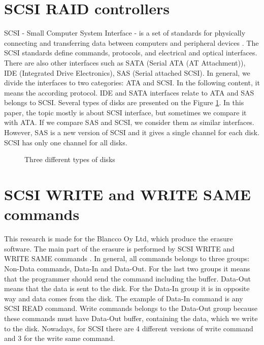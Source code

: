 \section{SCSI RAID controllers}
SCSI - Small Computer System Interface - is a set of standards for physically connecting and transferring data between computers and peripheral devices \cite{book_of_scsi}. The SCSI standards define commands, protocols, and electrical and optical interfaces. There are also other interfaces such as SATA (Serial ATA (AT Attachment)), IDE (Integrated Drive Electronics), SAS (Serial attached SCSI). In general, we divide the interfaces to two categories: ATA and SCSI. In the following content, it means the according protocol. IDE and SATA interfaces relate to ATA and SAS belongs to SCSI. Several types of disks are presented on the Figure \ref{fig:disks}. In this paper, the topic mostly is about SCSI interface, but sometimes we compare it with ATA. If we compare SAS and SCSI, we consider them as similar interfaces. However, SAS is a new version of SCSI and it gives a single channel for each disk. SCSI has only one channel for all disks.
\begin{figure}[h]
  \advance{}\textwidth
  \caption{Three different types of disks}
  \label{fig:disks}
\end{figure}

\section{SCSI WRITE and WRITE SAME commands}
\label{subsec:write_comm}
This research is made for the Blancco Oy Ltd, which produce the erasure software. The main part of the erasure is performed by SCSI WRITE and WRITE SAME commands \cite{scsi3_bc}. In general, all commands belongs to three groups: Non-Data commands, Data-In and Data-Out. For the last two groups it means that the programmer should send the command including the buffer. Data-Out means that the data is sent to the disk. For the Data-In group it is in opposite way and data comes from the disk. The example of Data-In command is any SCSI READ command. Write commands belongs to the Data-Out group because these commands must have Data-Out buffer, containing the data, which we write to the disk. Nowadays, for SCSI there are 4 different versions of write command and 3 for the write same command.  

